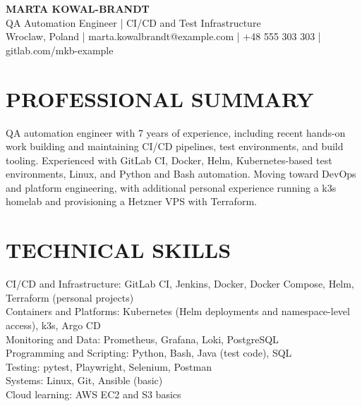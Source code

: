 \documentclass[11pt,a4paper]{article}
\begin{document}
\begin{center}
{\Huge\bfseries\color{primarycolor} MARTA KOWAL-BRANDT}\\[0.35em]
{\large\color{accentcolor} QA Automation Engineer | CI/CD and Test Infrastructure}\\[0.25em]
Wroclaw, Poland | marta.kowalbrandt@example.com | +48 555 303 303 | gitlab.com/mkb-example
\end{center}

\section*{PROFESSIONAL SUMMARY}
QA automation engineer with 7 years of experience, including recent hands-on work building and maintaining CI/CD pipelines, test environments, and build tooling. Experienced with GitLab CI, Docker, Helm, Kubernetes-based test environments, Linux, and Python and Bash automation. Moving toward DevOps and platform engineering, with additional personal experience running a k3s homelab and provisioning a Hetzner VPS with Terraform.

\section*{TECHNICAL SKILLS}
CI/CD and Infrastructure: GitLab CI, Jenkins, Docker, Docker Compose, Helm, Terraform (personal projects)\\
Containers and Platforms: Kubernetes (Helm deployments and namespace-level access), k3s, Argo CD\\
Monitoring and Data: Prometheus, Grafana, Loki, PostgreSQL\\
Programming and Scripting: Python, Bash, Java (test code), SQL\\
Testing: pytest, Playwright, Selenium, Postman\\
Systems: Linux, Git, Ansible (basic)\\
Cloud learning: AWS EC2 and S3 basics
\end{document}
